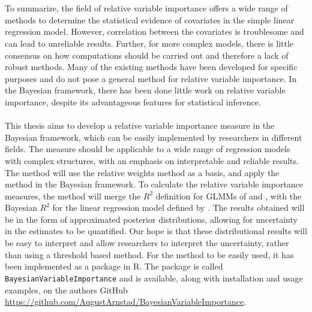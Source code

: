 \\
\\
To summarize, the field of relative variable importance offers a wide range of methods to determine the statistical evidence of covariates in the simple linear regression model. However, correlation between the covariates is troublesome and can lead to unreliable results. Further, for more complex models, there is little consensus on how computations should be carried out and therefore a lack of robust methods. Many of the existing methods have been developed for specific purposes and do not pose a general method for relative variable importance. In the Bayesian framework, there has been done little work on relative variable importance, despite its advantageous features for statistical inference.
\\
\\
This thesis aims to develop a relative variable importance measure in the Bayesian framework, which can be easily implemented by researchers in different fields. The measure should be applicable to a wide range of regression models with complex structures, with an emphasis on interpretable and reliable results. The method will use the relative weights method as a basis, and apply the method in the Bayesian framework. To calculate the relative variable importance measures, the method will merge the $R^2$ definition for GLMMs of \citep{nakagawa2013general} and \citep{nakagawa2017}, with the Bayesian $R^2$ for the linear regression model defined by \citet{gelman2017rsquared}. The results obtained will be in the form of approximated posterior distributions, allowing for uncertainty in the estimates to be quantified. Our hope is that these distributional results will be easy to interpret and allow researchers to interpret the uncertainty, rather than using a threshold based method. For the method to be easily used, it has been implemented as a package in R. The package is called \texttt{BayesianVariableImportance} and is available, along with installation and usage examples, on the authors GitHub \url{https://github.com/AugustArnstad/BayesianVariableImportance}. 
\\
\\
